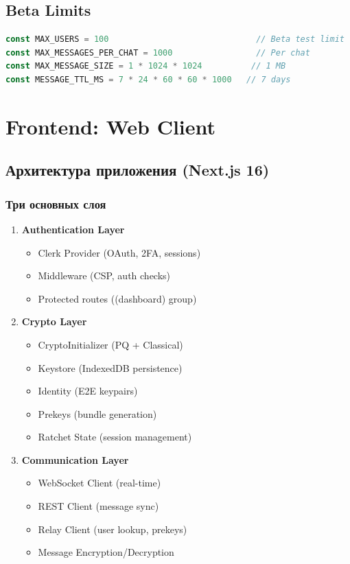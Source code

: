 \documentclass[11pt,a4paper,oneside]{book}
\begin{document}
\vspace{-0.3cm}\section{Beta Limits}
\begin{lstlisting}[language=TypeScript]
const MAX_USERS = 100                              // Beta test limit
const MAX_MESSAGES_PER_CHAT = 1000                 // Per chat
const MAX_MESSAGE_SIZE = 1 * 1024 * 1024          // 1 MB
const MESSAGE_TTL_MS = 7 * 24 * 60 * 60 * 1000   // 7 days
\end{lstlisting}
\vspace{-0.5cm}\chapter{Frontend: Web Client}
\vspace{-0.3cm}\section{Архитектура приложения (Next.js 16)}
\vspace{-0.2cm}\subsection{Три основных слоя}
\begin{enumerate}
  \item \textbf{Authentication Layer}
  \begin{itemize}
    \item Clerk Provider (OAuth, 2FA, sessions)
    \item Middleware (CSP, auth checks)
    \item Protected routes ((dashboard) group)
  \end{itemize}
  \item \textbf{Crypto Layer}
  \begin{itemize}
    \item CryptoInitializer (PQ + Classical)
    \item Keystore (IndexedDB persistence)
    \item Identity (E2E keypairs)
    \item Prekeys (bundle generation)
    \item Ratchet State (session management)
  \end{itemize}
  \item \textbf{Communication Layer}
  \begin{itemize}
    \item WebSocket Client (real-time)
    \item REST Client (message sync)
    \item Relay Client (user lookup, prekeys)
    \item Message Encryption/Decryption
  \end{itemize}
\end{enumerate}
\end{document}
